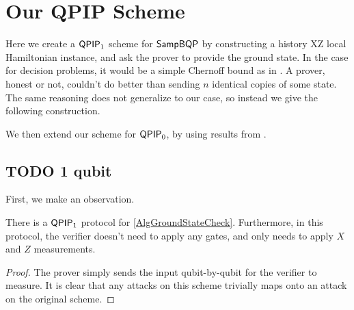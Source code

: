 \section{Our QPIP Scheme}

Here we create a $\operatorname{\mathsf{QPIP}}_1$ scheme for $\operatorname{\mathsf{SampBQP}}$ by constructing a history XZ local Hamiltonian instance, and ask the prover to provide the ground state. In the case for decision problems, it would be a simple Chernoff bound as in \cite{kitaev2002classical}. A prover, honest or not, couldn't do better than sending $n$ identical copies of some state. The same reasoning does not generalize to our case, so instead we give the following construction.

We then extend our scheme for $\operatorname{\mathsf{QPIP}}_0$, by using results from \cite{mahadev_delegation}.

\subsection{TODO 1 qubit}


First, we make an observation.

\begin{observation}
	There is a $\operatorname{\mathsf{QPIP}}_1$ protocol for \autoref{AlgGroundStateCheck}. Furthermore, in this protocol, the verifier doesn't need to apply any gates, and only needs to apply $X$ and $Z$ measurements.
\end{observation}
\begin{proof}
	The prover simply sends the input qubit-by-qubit for the verifier to measure. It is clear that any attacks on this scheme trivially maps onto an attack on the original scheme.
\end{proof}

